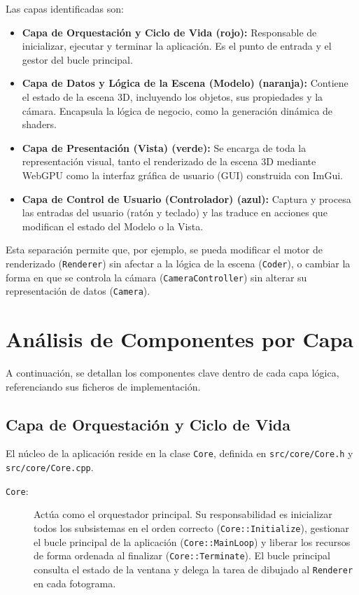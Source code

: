 Las capas identificadas son:

\begin{itemize}
    \item \textbf{Capa de Orquestación y Ciclo de Vida (rojo):} Responsable de inicializar, ejecutar y terminar la aplicación. Es el punto de entrada y el gestor del bucle principal.
    \item \textbf{Capa de Datos y Lógica de la Escena (Modelo) (naranja):} Contiene el estado de la escena 3D, incluyendo los objetos, sus propiedades y la cámara. Encapsula la lógica de negocio, como la generación dinámica de shaders.
    \item \textbf{Capa de Presentación (Vista) (verde):} Se encarga de toda la representación visual, tanto el renderizado de la escena 3D mediante WebGPU como la interfaz gráfica de usuario (GUI) construida con ImGui.
    \item \textbf{Capa de Control de Usuario (Controlador) (azul):} Captura y procesa las entradas del usuario (ratón y teclado) y las traduce en acciones que modifican el estado del Modelo o la Vista.
\end{itemize}

Esta separación permite que, por ejemplo, se pueda modificar el motor de
renderizado (\texttt{Renderer}) sin afectar a la lógica de la escena
(\texttt{Coder}), o cambiar la forma en que se controla la cámara
(\texttt{CameraController}) sin alterar su representación de datos
(\texttt{Camera}).

\section{Análisis de Componentes por Capa}

A continuación, se detallan los componentes clave dentro de cada capa lógica,
referenciando sus ficheros de implementación.

\subsection{Capa de Orquestación y Ciclo de Vida}

El núcleo de la aplicación reside en la clase \texttt{Core}, definida en
\texttt{src/core/Core.h} y \texttt{src/core/Core.cpp}.

\begin{description}
    \item[\texttt{Core}:] Actúa como el orquestador principal. Su responsabilidad es inicializar todos los subsistemas en el orden correcto (\texttt{Core::Initialize}), gestionar el bucle principal de la aplicación (\texttt{Core::MainLoop}) y liberar los recursos de forma ordenada al finalizar (\texttt{Core::Terminate}). El bucle principal consulta el estado de la ventana y delega la tarea de dibujado al \texttt{Renderer} en cada fotograma.
\end{description}

